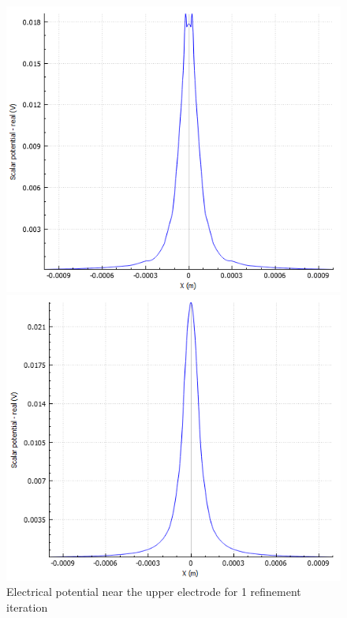 \documentclass{article}
\begin{document}
    \begin{figure}[htbp]
        \centering
        \begin{minipage}[b]{0.3\textwidth}
            \includegraphics[width=\textwidth]{FE_efield_at_electrode_1}
            \caption{Electrical potential near the upper electrode for 1 refinement iteration}
            \label{fig:FE_efield_at_electrode_1_1}
        \end{minipage}
        \hfill
        \begin{minipage}[b]{0.3\textwidth}
            \includegraphics[width=\textwidth]{FE_efield_at_electrode_2}

\end{minipage}
\end{figure}
\end{document}
